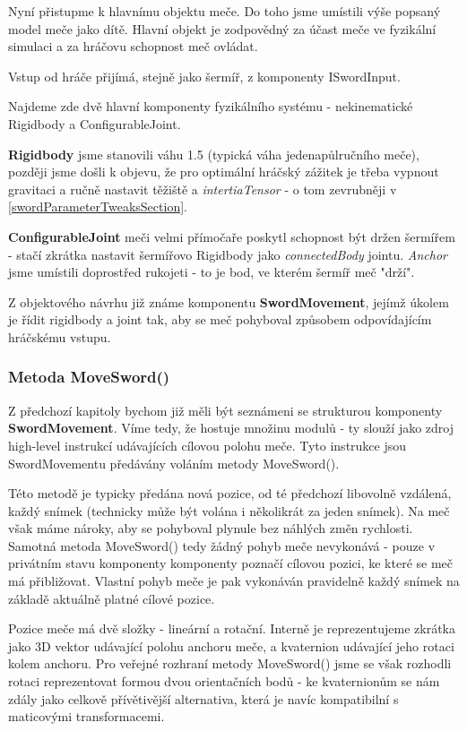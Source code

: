 Nyní přistupme k hlavnímu objektu meče. Do toho jsme umístili výše popsaný model meče jako dítě. Hlavní objekt je zodpovědný za účast meče ve fyzikální simulaci a za hráčovu schopnost meč ovládat.

Vstup od hráče přijímá, stejně jako šermíř, z komponenty ISwordInput.

Najdeme zde dvě hlavní komponenty fyzikálního systému - nekinematické Rigidbody a ConfigurableJoint.

\textbf{Rigidbody} jsme stanovili váhu 1.5 (typická váha jedenapůlručního meče), později jsme došli k objevu, že pro optimální hráčský zážitek je třeba vypnout gravitaci a ručně nastavit těžiště a \textit{intertiaTensor} - o tom zevrubněji v \ref{swordParameterTweaksSection}.

\textbf{ConfigurableJoint} meči velmi přímočaře poskytl schopnost být držen šermířem - stačí zkrátka nastavit šermířovo Rigidbody jako \textit{connectedBody} jointu. \textit{Anchor} jsme umístili doprostřed rukojeti - to je bod, ve kterém šermíř meč "drží". 

Z objektového návrhu již známe komponentu \textbf{SwordMovement}, jejímž úkolem je řídit rigidbody a joint tak, aby se meč pohyboval způsobem odpovídajícím hráčskému vstupu.


\subsubsection*{Metoda MoveSword()} \label{swordMovementMoveSwordImplementationSubsection}

Z předchozí kapitoly bychom již měli být seznámeni se strukturou komponenty \textbf{SwordMovement}. Víme tedy, že hostuje množinu modulů - ty slouží jako zdroj high-level instrukcí udávajících cílovou polohu meče. Tyto instrukce jsou SwordMovementu předávány voláním metody MoveSword().

Této metodě je typicky předána nová pozice, od té předchozí libovolně vzdálená, každý snímek (technicky může být volána i několikrát za jeden snímek). Na meč však máme nároky, aby se pohyboval plynule bez náhlých změn rychlosti. Samotná metoda MoveSword() tedy žádný pohyb meče nevykonává - pouze v privátním stavu komponenty komponenty poznačí cílovou pozici, ke které se meč má přibližovat. Vlastní pohyb meče je pak vykonáván pravidelně každý snímek na základě aktuálně platné cílové pozice.

Pozice meče má dvě složky - lineární a rotační. Interně je reprezentujeme zkrátka jako 3D vektor udávající polohu anchoru meče, a kvaternion udávající jeho rotaci kolem anchoru. Pro veřejné rozhraní metody MoveSword() jsme se však rozhodli rotaci reprezentovat formou dvou orientačních bodů - ke kvaternionům se nám zdály jako celkově přívětivější alternativa, která je navíc kompatibilní s maticovými transformacemi.


